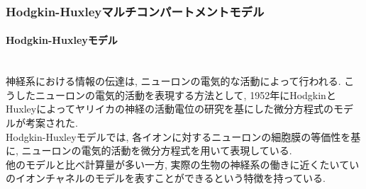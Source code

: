 \subsubsection{Hodgkin-Huxleyマルチコンパートメントモデル}
\label{subsec:hh-model}
\paragraph{Hodgkin-Huxleyモデル}~\\
神経系における情報の伝達は, ニューロンの電気的な活動によって行われる.
こうしたニューロンの電気的活動を表現する方法として,
1952年にHodgkinとHuxleyによってヤリイカの神経の活動電位の研究を基にした微分方程式のモデルが考案された\cite{hh}.\\
Hodgkin-Huxleyモデルでは, 各イオンに対するニューロンの細胞膜の等価性を基に, ニューロンの電気的活動を微分方程式を用いて表現している.\\
他のモデルと比べ計算量が多い一方, 実際の生物の神経系の働きに近くたいていのイオンチャネルのモデルを表すことができるという特徴を持っている.\\

